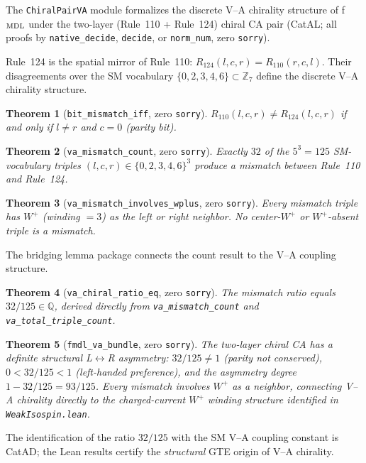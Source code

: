 \documentclass[11pt,a4paper]{article}
\newtheorem{theorem}{Theorem}[section]
\theoremstyle{definition}
\begin{document}
The \texttt{ChiralPairVA} module formalizes the discrete V--A chirality structure of
f$_{\rm MDL}$ under the two-layer (Rule~110 + Rule~124) chiral CA pair (CatAL;
all proofs by \lstinline|native_decide|, \lstinline|decide|, or \lstinline|norm_num|,
zero \texttt{sorry}).

Rule~124 is the spatial mirror of Rule~110: $R_{124}(l,c,r) = R_{110}(r,c,l)$.
Their disagreements over the SM vocabulary $\{0, 2, 3, 4, 6\}\subset\mathbb{Z}_7$
define the discrete V--A chirality structure.

\begin{theorem}[\lstinline|bit_mismatch_iff|, zero \texttt{sorry}]
$R_{110}(l,c,r) \neq R_{124}(l,c,r)$ if and only if $l \neq r$ and $c = 0$ (parity bit).
\end{theorem}

\begin{theorem}[\lstinline|va_mismatch_count|, zero \texttt{sorry}]
Exactly $32$ of the $5^3 = 125$ SM-vocabulary triples $(l,c,r)\in\{0,2,3,4,6\}^3$
produce a mismatch between Rule~110 and Rule~124.
\end{theorem}

\begin{theorem}[\lstinline|va_mismatch_involves_wplus|, zero \texttt{sorry}]
Every mismatch triple has $W^+$ (winding $= 3$) as the left or right neighbor.
No center-$W^+$ or $W^+$-absent triple is a mismatch.
\end{theorem}

The bridging lemma package connects the count result to the V--A coupling structure.

\begin{theorem}[\lstinline|va_chiral_ratio_eq|, zero \texttt{sorry}]
The mismatch ratio equals $32/125\in\mathbb{Q}$, derived directly from
\lstinline|va_mismatch_count| and \lstinline|va_total_triple_count|.
\end{theorem}

\begin{theorem}[\lstinline|fmdl_va_bundle|, zero \texttt{sorry}]
The two-layer chiral CA has a definite structural L$\leftrightarrow$R asymmetry:
$32/125 \neq 1$ (parity not conserved), $0 < 32/125 < 1$ (left-handed preference),
and the asymmetry degree $1 - 32/125 = 93/125$.  Every mismatch involves $W^+$
as a neighbor, connecting V--A chirality directly to the charged-current $W^+$
winding structure identified in \texttt{WeakIsospin.lean}.
\end{theorem}

The identification of the ratio $32/125$ with the SM V--A coupling constant is CatAD;
the Lean results certify the \emph{structural} GTE origin of V--A chirality.
\end{document}
